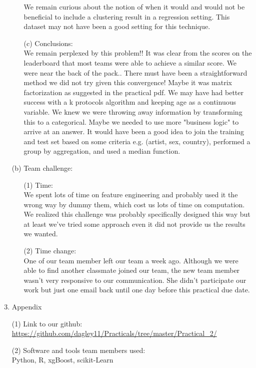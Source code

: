 \documentclass[12pt]{article}
\newcommand\tab[1][0.5cm]{\hspace*{#1}}
\begin{document}
\begin{enumerate}
\begin{itemize}
\tab We remain curious about the notion of when it would and would not be beneficial to include a clustering result in a regression setting. This dataset may not have been a good setting for this technique.  

 \item[(c)]
 Conclusions: \\
 We remain perplexed by this problem!! It was clear from the scores on the leaderboard that most teams were able to achieve a similar score.  We were near the back of the pack..  There must have been a straightforward method we did not try given this convergence!  Maybe it was matrix factorization as suggested in the practical pdf.  We may have had better success with a k protocols algorithm and keeping age as a continuous variable.  We knew we were throwing away information by transforming this to a categorical.  Maybe we needed to use more "business logic" to arrive at an answer.  It would have been a good idea to join the training and test set based on some criteria e.g. (artist, sex, country), performed a group by aggregation, and used a median function.

\end{itemize}

\item[(b)]
Team challenge:
\begin{itemize}
\item[(1)] Time: \\
\tab We spent lots of time on feature engineering and probably used it the wrong way by dummy them, which cost us lots of time on computation. We realized this challenge was probably specifically designed this way but at least we've tried some approach even it did not provide us the results we wanted. 
\item[(2)] Time change: \\
\tab One of our team member left our team a week ago. Although we were able to find another classmate joined our team, the new team member wasn't very responsive to our communication. She didn't participate our work but just one email back until one day before this practical due date. 

\end{itemize}

\newpage
\item
Appendix
\item[(1)]Link to our github:\\
\url{https://github.com/dagley11/Practicals/tree/master/Practical_2/}
\item[(2)]Software and tools team members used:\\
Python, R, xgBoost, scikit-Learn

\end{enumerate}
\end{document}
